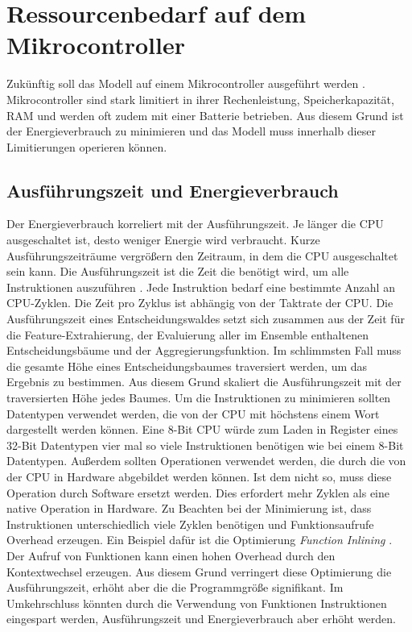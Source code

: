 \section{Ressourcenbedarf auf dem Mikrocontroller}
\label{sec:dt_resource_usage}
Zukünftig soll das Modell auf einem Mikrocontroller ausgeführt werden \cite{antragForschungsprojekt}.
Mikrocontroller sind stark limitiert in ihrer Rechenleistung, Speicherkapazität, RAM und werden oft zudem mit einer Batterie betrieben.
Aus diesem Grund ist der Energieverbrauch zu minimieren und das Modell muss innerhalb dieser Limitierungen operieren können.

\subsection{Ausführungszeit und Energieverbrauch}
\label{sub_sec:dt_ru_execution_time}
Der Energieverbrauch korreliert mit der Ausführungszeit.
Je länger die CPU ausgeschaltet ist, desto weniger Energie wird verbraucht.
Kurze Ausführungszeiträume vergrößern den Zeitraum, in dem die CPU ausgeschaltet sein kann.
Die Ausführungszeit ist die Zeit die benötigt wird, um alle Instruktionen auszuführen \cite{dymelThesis}.
Jede Instruktion bedarf eine bestimmte Anzahl an CPU-Zyklen.
Die Zeit pro Zyklus ist abhängig von der Taktrate der CPU.
\newline
\newline
Die Ausführungszeit eines Entscheidungswaldes setzt sich zusammen aus der Zeit für die Feature-Extrahierung, der Evaluierung aller im Ensemble enthaltenen Entscheidungsbäume
und der Aggregierungsfunktion.
Im schlimmsten Fall muss die gesamte Höhe eines Entscheidungsbaumes traversiert werden, um das Ergebnis zu bestimmen. Aus diesem Grund skaliert die Ausführungszeit mit der
traversierten Höhe jedes Baumes.
\newline
\newline
Um die Instruktionen zu minimieren sollten Datentypen verwendet werden, die von der CPU mit höchstens einem Wort dargestellt werden können.
Eine 8-Bit CPU würde zum Laden in Register eines 32-Bit Datentypen vier mal so viele Instruktionen benötigen wie bei einem 8-Bit Datentypen.
Außerdem sollten Operationen verwendet werden, die durch die von der CPU in Hardware abgebildet werden können.
Ist dem nicht so, muss diese Operation durch Software ersetzt werden.
Dies erfordert mehr Zyklen als eine native Operation in Hardware.
\newline
\newline
Zu Beachten bei der Minimierung ist, dass Instruktionen unterschiedlich viele Zyklen benötigen und Funktionsaufrufe Overhead erzeugen.
Ein Beispiel dafür ist die Optimierung \textit{Function Inlining} \cite{leupers1999function}.
Der Aufruf von Funktionen kann einen hohen Overhead durch den Kontextwechsel erzeugen.
Aus diesem Grund verringert diese Optimierung die Ausführungszeit, erhöht aber die die Programmgröße signifikant.
Im Umkehrschluss könnten durch die Verwendung von Funktionen Instruktionen eingespart werden, Ausführungszeit und Energieverbrauch aber erhöht werden.

